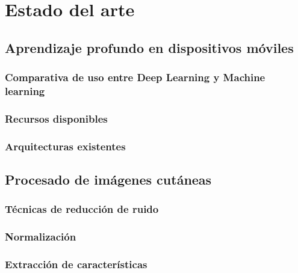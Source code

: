 \chapter{Estado del arte}

\section{Aprendizaje profundo en dispositivos móviles}
\subsection{Comparativa de uso entre Deep Learning y Machine learning}
\subsection{Recursos disponibles}
\subsection{Arquitecturas existentes}

\section{Procesado de imágenes cutáneas}
\subsection{Técnicas de reducción de ruido}
\subsection{Normalización}
\subsection{Extracción de características}


